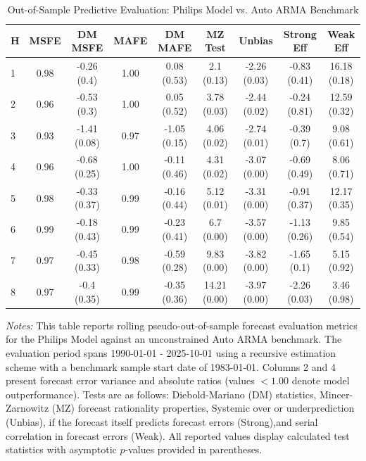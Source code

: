 \begin{table}[htbp]
\centering
\caption{Out-of-Sample Predictive Evaluation: Philips Model vs. Auto ARMA Benchmark}
\label{tab:philips_model_evaluation}
\footnotesize
\begin{tabular}{l cccccccc}
\hline\hline
\rule{0pt}{3ex}
\textbf{H} & \textbf{MSFE} & \textbf{DM MSFE} & \textbf{MAFE} & \textbf{DM MAFE} & \textbf{MZ Test} & \textbf{Unbias} & \textbf{Strong Eff} & \textbf{Weak Eff} \\[0.5ex]
\hline
\rule{0pt}{2.5ex}
1 & 0.98 & -0.26 (0.4) & 1.00 & 0.08 (0.53) & 2.1 (0.13) & -2.26 (0.03) & -0.83 (0.41) & 16.18 (0.18) \\
2 & 0.96 & -0.53 (0.3) & 1.00 & 0.05 (0.52) & 3.78 (0.03) & -2.44 (0.02) & -0.24 (0.81) & 12.59 (0.32) \\
3 & 0.93 & -1.41 (0.08) & 0.97 & -1.05 (0.15) & 4.06 (0.02) & -2.74 (0.01) & -0.39 (0.7) & 9.08 (0.61) \\
4 & 0.96 & -0.68 (0.25) & 1.00 & -0.11 (0.46) & 4.31 (0.02) & -3.07 (0.00) & -0.69 (0.49) & 8.06 (0.71) \\
5 & 0.98 & -0.33 (0.37) & 0.99 & -0.16 (0.44) & 5.12 (0.01) & -3.31 (0.00) & -0.91 (0.37) & 12.17 (0.35) \\
6 & 0.99 & -0.18 (0.43) & 0.99 & -0.23 (0.41) & 6.7 (0.00) & -3.57 (0.00) & -1.13 (0.26) & 9.85 (0.54) \\
7 & 0.97 & -0.45 (0.33) & 0.98 & -0.59 (0.28) & 9.83 (0.00) & -3.82 (0.00) & -1.65 (0.1) & 5.15 (0.92) \\
8 & 0.97 & -0.4 (0.35) & 0.99 & -0.35 (0.36) & 14.21 (0.00) & -3.97 (0.00) & -2.26 (0.03) & 3.46 (0.98) \\
\hline\hline
\end{tabular}%
\par\smallskip
\parbox{\textwidth}{\scriptsize \textit{Notes:} This table reports rolling pseudo-out-of-sample forecast evaluation metrics for the Philips Model against an unconstrained Auto ARMA benchmark. The evaluation period spans 1990-01-01 - 2025-10-01 using a recursive estimation scheme with a benchmark sample start date of 1983-01-01. Columns 2 and 4 present forecast error variance and absolute ratios (values $< 1.00$ denote model outperformance). Tests are as follows: Diebold-Mariano (DM) statistics, Mincer-Zarnowitz (MZ) forecast rationality properties, Systemic over or underprediction (Unbias), if the forecast itself predicts forecast errors (Strong),and serial correlation in forecast errors (Weak). All reported values display calculated test statistics with asymptotic $p$-values provided in parentheses.}
\end{table}
